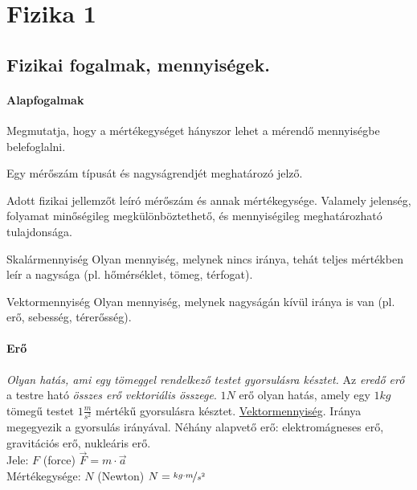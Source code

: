 \section{Fizika 1}
\subsection{Fizikai fogalmak, mennyiségek.}
\paragraph{Alapfogalmak}
\begin{description}[nosep]
	\item[Mérőszám] Megmutatja, hogy a mértékegységet hányszor lehet a mérendő mennyiségbe belefoglalni.
	\item[Mértékegység] Egy mérőszám típusát és nagyságrendjét meghatározó jelző.
	\item[Fizikai mennyiség] Adott fizikai jellemzőt leíró mérőszám és annak mértékegysége. Valamely jelenség, folyamat minőségileg megkülönböztethető, és mennyiségileg meghatározható tulajdonsága.
	\begin{enumdescript}[nosep]
		\item[Skalármennyiség] Olyan mennyiség, melynek nincs iránya, tehát teljes mértékben leír a nagysága (pl. hőmérséklet, tömeg, térfogat).
		\item[Vektormennyiség] Olyan mennyiség, melynek nagyságán kívül iránya is van (pl. erő, sebesség, térerősség).
	\end{enumdescript}
\end{description}

\paragraph{Erő}
\emph{Olyan hatás, ami egy tömeggel rendelkező testet gyorsulásra késztet.} Az \emph{eredő erő} a testre ható \emph{összes erő vektoriális összege}. $1N$ erő olyan hatás, amely egy $1kg$$  $ tömegű testet $1\frac{m}{s^2}$ mértékű gyorsulásra késztet. \underline{Vektormennyiség}. Iránya megegyezik a gyorsulás irányával. Néhány alapvető erő: elektromágneses erő, gravitációs erő, nukleáris erő.\\
Jele: $F$ (force) \quad $\vec{F} = m \cdot \vec{a}$\\
Mértékegysége: $N$ (Newton) \quad $ N = \nicefrac{kg\cdot m}{s^2} $

